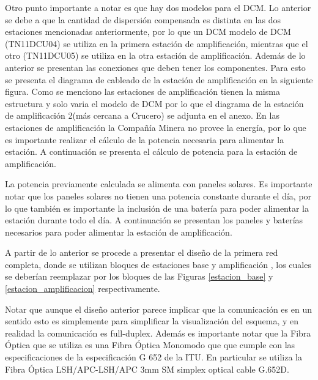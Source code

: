 \documentclass[letterpaper,11pt]{article} %
\begin{document}
\newp
Otro punto importante a notar es que hay dos modelos para el DCM. Lo anterior se debe a que la cantidad de dispersión compensada es distinta en las dos estaciones mencionadas anteriormente, por lo que un DCM modelo de DCM (TN11DCU04) se utiliza en la primera estación de amplificación, mientras que el otro (TN11DCU05) se utiliza en la otra estación de amplificación. 
\newp
Además de lo anterior se presentan las conexiones que deben tener los componentes. Para esto se presenta el diagrama de cableado de la estación de amplificación en la siguiente figura.
\newp
Como se menciono las estaciones de amplificación tienen la misma estructura y solo varia el modelo de DCM por lo que el diagrama de la estación de amplificación 2(más cercana a Crucero) se adjunta en el anexo.
\newp
En las estaciones de amplificación la Compañía Minera no provee la energía, por lo que es importante realizar el cálculo de la potencia necesaria para alimentar la estación. A continuación se presenta el cálculo de potencia para la estación de amplificación.




\newp
La potencia previamente calculada se alimenta con paneles solares. Es importante notar que los paneles solares no tienen una potencia constante durante el día, por lo que también es importante la inclusión de una batería para poder alimentar la estación durante todo el día. A continuación se presentan los paneles y baterías necesarios para poder alimentar la estación de amplificación.



\newp
A partir de lo anterior se procede a presentar el diseño de la primera red completa, donde se utilizan bloques de estaciones base y amplificación , los cuales se deberían reemplazar por los bloques de las Figuras \ref{estacion_base} y \ref{estacion_amplificacion} respectivamente.


\newp
Notar que aunque el diseño anterior parece implicar que la comunicación es en un sentido esto es simplemente para simplificar la visualización del esquema, y en realidad la comunicación es full-duplex. Además es importante notar que la Fibra Óptica que se utiliza es una Fibra Óptica Monomodo que que cumple con las especificaciones de la especificación G 652 de la ITU. En particular se utiliza la Fibra Óptica LSH/APC-LSH/APC 3mm SM simplex optical cable G.652D.
\end{document}
